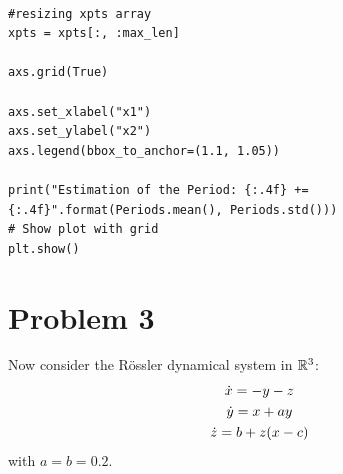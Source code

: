 \begin{solution}
\begin{lstlisting}
    
#resizing xpts array
xpts = xpts[:, :max_len]

axs.grid(True)

axs.set_xlabel("x1")
axs.set_ylabel("x2")
axs.legend(bbox_to_anchor=(1.1, 1.05))

print("Estimation of the Period: {:.4f} += {:.4f}".format(Periods.mean(), Periods.std()))
# Show plot with grid
plt.show()
\end{lstlisting}
\end{solution}

\clearpage

\newpage
\section{Problem 3}
Now consider the R\"ossler dynamical system in $\mathbb{R}^3$:
\begin{gather*}
    \dot{x} = -y - z\\
    \dot{y} = x+ay\\
    \dot{z} = b + z(x - c)
\end{gather*}
with $a = b = 0.2$.

